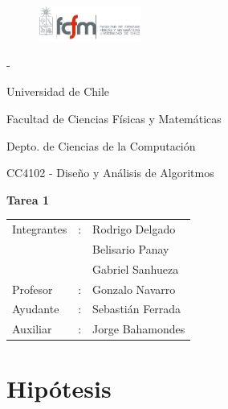\documentclass[letterpaper,10pt]{article}
\begin{document}
	\begin{titlepage}

		\begin{figure}
			\includegraphics[width=0.3\textwidth]{logoFCFM.png}
		\end{figure}

		\noindent \phantom - %

		Universidad de Chile

		Facultad de Ciencias Físicas y Matemáticas

		Depto. de Ciencias de la Computación

		CC4102 - Diseño y Análisis de Algoritmos

		\vfill

		\begin{center}
			\begin{Huge}
				{\textbf{Tarea 1}}
			\end{Huge}
		\end{center}

		\vfill

		\begin{flushright}
			\begin{tabular}{lll}
				Integrantes	&:	& Rodrigo Delgado\\
				&	& Belisario Panay\\
				&	& Gabriel Sanhueza\\
				Profesor	&:	& Gonzalo Navarro\\
				Ayudante	&:	& Sebastián Ferrada\\
				Auxiliar	&:	& Jorge Bahamondes\\
			\end{tabular}
		\end{flushright}

	\end{titlepage}

	\pagebreak

	\section*{Hipótesis}
\end{document}

